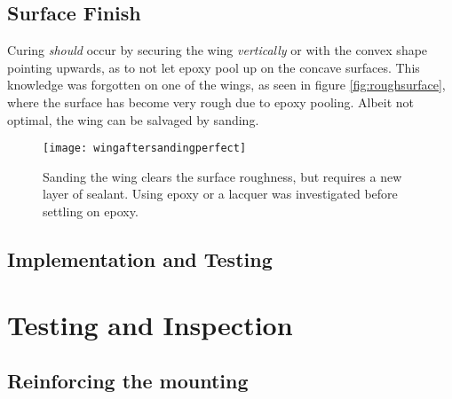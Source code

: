   \subsection{Surface Finish}

    Curing \emph{should} occur by securing the wing \emph{vertically} or with the convex shape pointing upwards, as to not let epoxy pool up on the concave surfaces. This knowledge was forgotten on one of the wings, as seen in figure \ref{fig:roughsurface}, where the surface has become very rough due to epoxy pooling. Albeit not optimal, the wing can be salvaged by sanding.

    \begin{figure}
      \texttt{[image: wingaftersandingperfect]}
      \caption{Sanding the wing clears the surface roughness, but requires a new layer of sealant. Using epoxy or a lacquer was investigated before settling on epoxy.}
      \label{fig:wingaftersanding}
    \end{figure}

  \subsection{Implementation and Testing}

\section{Testing and Inspection}

  \subsection{Reinforcing the mounting}
